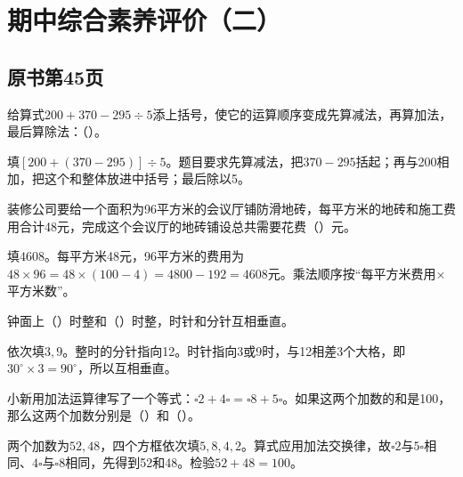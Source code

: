 
\section{期中综合素养评价（二）}



\subsection*{原书第45页}

给算式\(200+370-295\div5\)添上括号，使它的运算顺序变成先算减法，再算加法，最后算除法：（\hspace{1.8em}）。\par
\begin{BookAnswer}
填\([200+(370-295)]\div5\)。题目要求先算减法，把\(370-295\)括起；再与200相加，把这个和整体放进中括号；最后除以5。
\end{BookAnswer}

装修公司要给一个面积为96平方米的会议厅铺防滑地砖，每平方米的地砖和施工费用合计48元，完成这个会议厅的地砖铺设总共需要花费（\hspace{1.8em}）元。\par
\begin{BookAnswer}
填\(4608\)。每平方米48元，96平方米的费用为\(48\times96=48\times(100-4)=4800-192=4608\)元。乘法顺序按“每平方米费用×平方米数”。
\end{BookAnswer}

钟面上（\hspace{1.8em}）时整和（\hspace{1.8em}）时整，时针和分针互相垂直。\par
\begin{BookAnswer}
依次填\(3,9\)。整时的分针指向12。时针指向3或9时，与12相差3个大格，即\(30^\circ\times3=90^\circ\)，所以互相垂直。
\end{BookAnswer}

小新用加法运算律写了一个等式：\(\square2+4\square=\square8+5\square\)。如果这两个加数的和是100，那么这两个加数分别是（\hspace{1.8em}）和（\hspace{1.8em}）。\par
\begin{BookAnswer}
两个加数为\(52,48\)，四个方框依次填\(5,8,4,2\)。算式应用加法交换律，故\(\square2\)与\(5\square\)相同、\(4\square\)与\(\square8\)相同，先得到52和48。检验\(52+48=100\)。
\end{BookAnswer}

